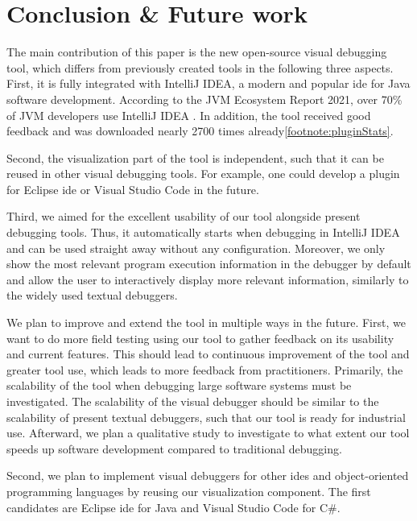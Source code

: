 \documentclass[conference]{IEEEtran}
\newcommand{\intellij}{IntelliJ IDEA}
\begin{document}
\section{Conclusion \& Future work} \label{sec:conclusion}
The main contribution of this paper is the new open-source visual debugging tool, which differs from previously created tools in the following three aspects.
First, it is fully integrated with \intellij{}, a modern and popular \gls*{ide} for Java software development.
According to the JVM Ecosystem Report 2021, over 70\% of JVM developers use \intellij{}  \cite{JVMEcosystemReport2021}.
In addition, the tool received good feedback and was downloaded nearly 2700 times already\cref{footnote:pluginStats}.

Second, the visualization part of the tool is independent, such that it can be reused in other visual debugging tools.
For example, one could develop a plugin for Eclipse \gls*{ide} or Visual Studio Code in the future.

Third, we aimed for the excellent usability of our tool alongside present debugging tools.
Thus, it automatically starts when debugging in \intellij{} and can be used straight away without any configuration.
Moreover, we only show the most relevant program execution information in the debugger by default and allow the user to interactively display more relevant information, similarly to the widely used textual debuggers.

We plan to improve and extend the tool in multiple ways in the future.
First, we want to do more field testing using our tool to gather feedback on its usability and current features.
This should lead to continuous improvement of the tool and greater tool use, which leads to more feedback from practitioners. 
Primarily, the scalability of the tool when debugging large software systems must be investigated.
The scalability of the visual debugger should be similar to the scalability of present textual debuggers, such that our tool is ready for industrial use.
Afterward, we plan a qualitative study to investigate to what extent our tool speeds up software development compared to traditional debugging.

Second, we plan to implement visual debuggers for other \glspl*{ide} and object-oriented programming languages by reusing our visualization component.
The first candidates are Eclipse \gls*{ide} for Java and Visual Studio Code for C\#.
\end{document}

